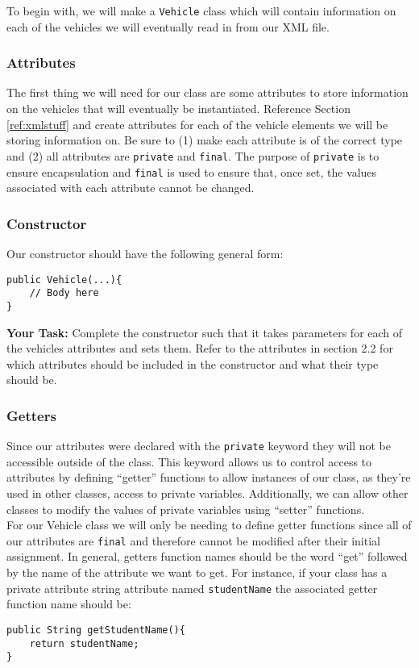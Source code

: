 To begin with, we will make a \lstinline|Vehicle| class which will contain
information on each of the vehicles we will eventually read in from our XML
file. 


\subsubsection{Attributes}
The first thing we will need for our class are some attributes to store
information on the vehicles that will eventually be instantiated. Reference
Section \ref{ref:xmlstuff} and create attributes for each of the vehicle
elements we will be storing information on. Be sure to (1) make each attribute
is of the correct type and (2) all attributes are \lstinline|private| and
\lstinline|final|. The purpose of \lstinline|private| is to ensure
encapsulation and \lstinline|final| is used to ensure that, once set, the
values associated with each attribute cannot be changed.\\

\subsubsection{Constructor}
Our constructor should have the following general form:
\begin{lstlisting}[frame=trBL]
public Vehicle(...){
    // Body here
}
\end{lstlisting}
\textbf{Your Task: } Complete the constructor such that it takes parameters for
each of the vehicles attributes and sets them. Refer to the attributes in section
2.2 for which attributes should be included in the constructor and what their
type should be.\\

\subsubsection{Getters}\label{sec:getter}

Since our attributes were declared with the \lstinline|private| keyword they
will not be accessible outside of the class. This keyword allows us to control
access to attributes by defining ``getter'' functions to allow instances of our
class, as they're used in other classes, access to private variables.
Additionally, we can allow other classes to modify the values of private
variables using ``setter'' functions.\\

For our Vehicle class we will only be needing to define getter functions since
all of our attributes are \lstinline|final| and therefore cannot be modified
after their initial assignment.  In general, getters function names should be
the word ``get'' followed by the name of the attribute we want to get. For
instance, if your class has a private attribute string attribute named
\lstinline|studentName| the associated getter function name should be:
\begin{lstlisting}[frame=trBL]
public String getStudentName(){ 
    return studentName;
}
\end{lstlisting}

